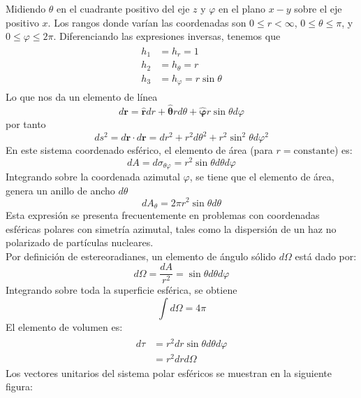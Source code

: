 Midiendo $\theta$ en el cuadrante positivo del eje $z$ y $\varphi$ en el plano $x-y$ sobre el eje positivo $x$. Los rangos donde varían las coordenadas son $0 \leq r < \infty$, $0 \leq \theta \leq \pi$, y $ 0 \leq \varphi \leq 2 \pi$. Diferenciando las expresiones inversas, tenemos que 
\begin{eqnarray}
\begin{aligned}
h_{1} &= h_{r} = 1 \\
h_{2} &= h_{\theta} = r \\
h_{3} &= h_{\varphi} = r \sin \theta 
\end{aligned}
\end{eqnarray}
Lo que nos da un elemento de línea
\[ d \mathbf{r} = \mathbf{\widehat{r}} dr + \bm{\widehat{\theta}} r d\theta + \bm{\widehat{\varphi}} r \sin \theta d \varphi \]
por tanto
\[ ds^{2} = d \mathbf{r} \cdot d \mathbf{r} =  dr^{2} + r^{2} d \theta^{2} + r^{2} \sin^{2} \theta d \varphi^{2} \]
En este sistema coordenado esférico, el elemento de área (para $r=\text{constante}$) es:
\[ dA = d\sigma_{\theta \varphi} = r^{2} \sin \theta d\theta d\varphi \]
Integrando sobre la coordenada azimutal $\varphi$, se tiene que el elemento de área, genera un anillo de ancho $d\theta$
\[ dA_{\theta} = 2 \pi r^{2} \sin \theta d \theta \]
Esta expresión se presenta frecuentemente en problemas con coordenadas esféricas polares con simetría azimutal, tales como la dispersión de un haz no polarizado de partículas nucleares.
\\
Por definición de estereoradianes, un elemento de ángulo sólido $d\Omega$ está dado por:
\[ d \Omega = \dfrac{dA}{r^{2}} = \sin \theta d \theta d \varphi \]
Integrando sobre toda la superficie esférica, se obtiene
\[ \int d \Omega = 4 \pi \]
El elemento de volumen es:
\begin{eqnarray}
\begin{aligned}
d \tau &= r^{2} dr \sin \theta d \theta d\varphi \\
&= r^{2} d r d \Omega
\end{aligned}
\end{eqnarray}
Los vectores unitarios del sistema polar esféricos se muestran en la siguiente figura:
